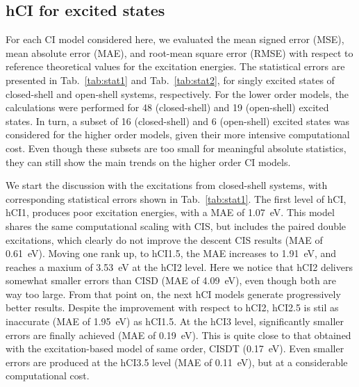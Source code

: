 \documentclass[aip,jcp,reprint,noshowkeys,superscriptaddress]{revtex4-1}
\begin{document}


\subsection{hCI for excited states}
\label{sec:res_B}


For each CI model considered here, we evaluated the mean signed error (MSE), mean absolute error (MAE), and root-mean square error (RMSE) 
with respect to reference theoretical values for the excitation energies.
The statistical errors are presented in Tab.~\ref{tab:stat1} and Tab.~\ref{tab:stat2},
for singly excited states of closed-shell and open-shell systems, respectively.
For the lower order models, the calculations were performed for 48 (closed-shell) and 19 (open-shell) excited states.
In turn, a subset of 16 (closed-shell) and 6 (open-shell) excited states was considered for the higher order models, given their more intensive computational cost.
Even though these subsets are too small for meaningful absolute statistics, they can still show the main trends on the higher order CI models.


We start the discussion with the excitations from closed-shell systems, with corresponding statistical errors shown in Tab.~\ref{tab:stat1}.
%
The first level of hCI, hCI1, produces poor excitation energies, with a MAE of \SI{1.07}{\eV}.
This model shares the same computational scaling with CIS, but includes the paired double excitations, 
which clearly do not improve the descent CIS results (MAE of \SI{0.61}{\eV}).
Moving one rank up, to hCI1.5, the MAE increases to \SI{1.91}{\eV}, and reaches a maxium of \SI{3.53}{\eV} at the hCI2 level.
Here we notice that hCI2 delivers somewhat smaller errors than CISD (MAE of \SI{4.09}{\eV}), even though both are way too large.
From that point on, the next hCI models generate progressively better results.
Despite the improvement with respect to hCI2, hCI2.5 is stil as inaccurate (MAE of \SI{1.95}{\eV}) as hCI1.5.
At the hCI3 level, significantly smaller errors are finally achieved (MAE of \SI{0.19}{\eV}).
This is quite close to that obtained with the excitation-based model of same order, CISDT (\SI{0.17}{\eV}).
Even smaller errors are produced at the hCI3.5 level (MAE of \SI{0.11}{\eV}), but at a considerable computational cost.
\end{document}

